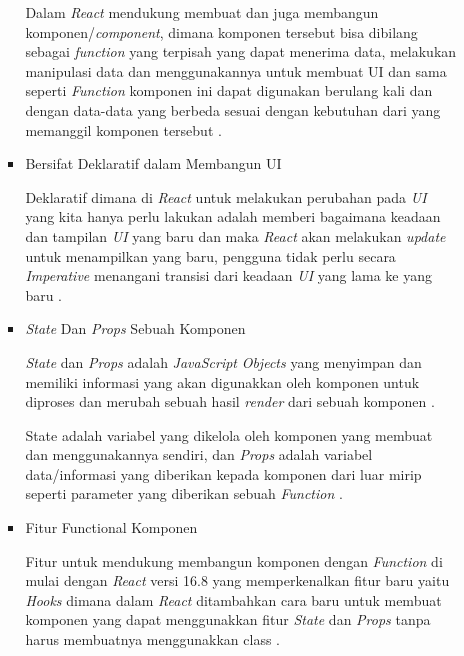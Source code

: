 \documentclass[a4paper]{article}
\begin{document}
\begin{enumerate}[label=\alph*. ]
\begin{enumerate}
\begin{itemize}
                        Dalam \textit{React} mendukung membuat dan juga membangun komponen/\textit{component}, dimana komponen tersebut bisa dibilang sebagai \textit{function} yang terpisah yang dapat menerima data, melakukan manipulasi data dan menggunakannya untuk membuat UI dan sama seperti \textit{Function} komponen ini dapat digunakan berulang kali dan dengan data-data yang berbeda sesuai dengan kebutuhan dari yang memanggil komponen tersebut \autocite{React_official}.

                        \item Bersifat Deklaratif dalam Membangun UI

                        Deklaratif dimana di \textit{React} untuk melakukan perubahan pada \textit{UI} yang kita hanya perlu lakukan adalah memberi bagaimana keadaan dan tampilan \textit{UI} yang baru dan maka \textit{React} akan melakukan \textit{update} untuk menampilkan yang baru, pengguna tidak perlu secara \textit{Imperative} menangani transisi dari keadaan \textit{UI} yang lama ke yang baru \autocite{React_official}.

                        \item \textit{State} Dan \textit{Props} Sebuah Komponen

                        \textit{State} dan \textit{Props} adalah \textit{JavaScript} \textit{Objects} yang menyimpan dan memiliki informasi yang akan digunakkan oleh komponen untuk diproses dan merubah sebuah hasil \textit{render} dari sebuah komponen \autocite{React_state_props}.

                        State adalah variabel yang dikelola oleh komponen yang membuat dan menggunakannya sendiri, dan \textit{Props} adalah variabel data/informasi yang diberikan kepada komponen dari luar mirip seperti parameter yang diberikan sebuah \textit{Function} \autocite{React_state_props}.

                        \item Fitur Functional Komponen

                        Fitur untuk mendukung membangun komponen dengan \textit{Function} di mulai dengan \textit{React} versi 16.8 yang memperkenalkan fitur baru yaitu \textit{Hooks} dimana dalam \textit{React} ditambahkan cara baru untuk membuat komponen yang dapat menggunakkan fitur \textit{State} dan \textit{Props} tanpa harus membuatnya menggunakkan class \autocite{React_functional_components_hooks}.


\end{itemize}
\end{enumerate}
\end{enumerate}
\end{document}
